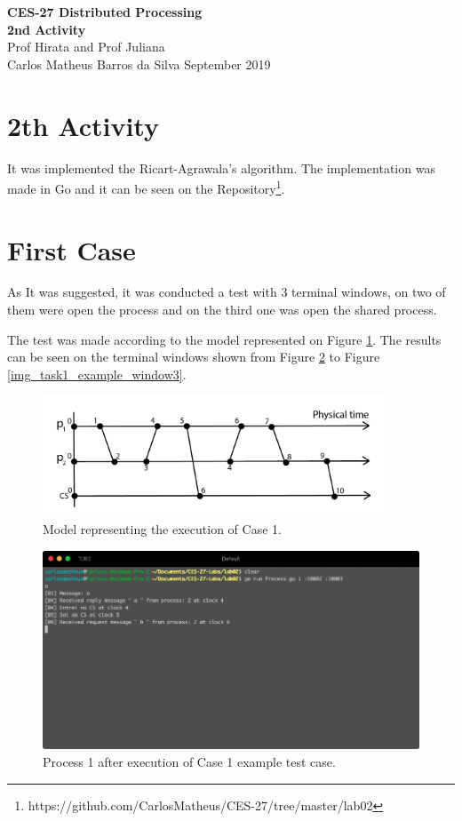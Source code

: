 \documentclass[a4paper, 11pt]{article}
\begin{document}
\noindent
\large\textbf{CES-27 Distributed Processing} \\
\textbf{2nd Activity} \\
\normalsize Prof Hirata and Prof Juliana  \\
Carlos Matheus Barros da Silva \hfill September 2019

\section*{2th Activity}

It was implemented the Ricart-Agrawala's algorithm. The implementation was made in Go and it can be seen on the Repository\footnote{https://github.com/CarlosMatheus/CES-27/tree/master/lab02}.

\section*{First Case}

As It was suggested, it was conducted a test with 3 terminal windows, on two of them were open the process and on the third one was open the shared process.

The test was made according to the model represented on Figure \ref{img_task1}. The results can be seen on the terminal windows shown from Figure \ref{img_task1_example_window1} to Figure \ref{img_task1_example_window3}.

\begin{figure}[h]
  \begin{center}
  \includegraphics[width=4in]{./imgs/case1.png}
  \caption{Model representing the execution of Case 1.}
  \label{img_task1}
  \end{center}
\end{figure}

\begin{figure}[h]
  \begin{center}
  \includegraphics[width=4.5in]{./imgs/case1process1.png}
  \caption{Process 1 after execution of Case 1 example test case.}
  \label{img_task1_example_window1}
  \end{center}
\end{figure}
\end{document}
